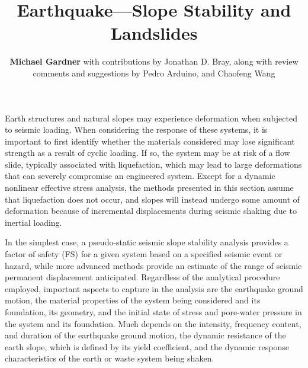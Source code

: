 %
%
%


\title{Earthquake---Slope Stability and Landslides}
\author{
    \textbf{Michael Gardner}
    with contributions by Jonathan D. Bray,
    \newline
    along with review comments and suggestions by Pedro Arduino, and Chaofeng Wang
}
\tocauthor{}
%
%
\maketitle

Earth structures and natural slopes may experience deformation when subjected to seismic loading. When considering the response of these systems, it is important to first identify whether the materials considered may lose significant strength as a result of cyclic loading. If so, the system may be at risk of a flow slide, typically associated with liquefaction, which may lead to large deformations that can severely compromise an engineered system. Except for a dynamic nonlinear effective stress analysis, the methods presented in this section assume that liquefaction does not occur, and slopes will instead undergo some amount of deformation because of incremental displacements during seismic shaking due to inertial loading.

In the simplest case, a pseudo-static seismic slope stability analysis provides a factor of safety (FS) for a given system based on a specified seismic event or hazard, while more advanced methods provide an estimate of the range of seismic permanent displacement anticipated. Regardless of the analytical procedure employed, important aspects to capture in the analysis are the earthquake ground motion, the material properties of the system being considered and its foundation, its geometry, and the initial state of stress and pore-water pressure in the system and its foundation. Much depends on the intensity, frequency content, and duration of the earthquake ground motion, the dynamic resistance of the earth slope, which is defined by its yield coefficient, and the dynamic response characteristics of the earth or waste system being shaken.

